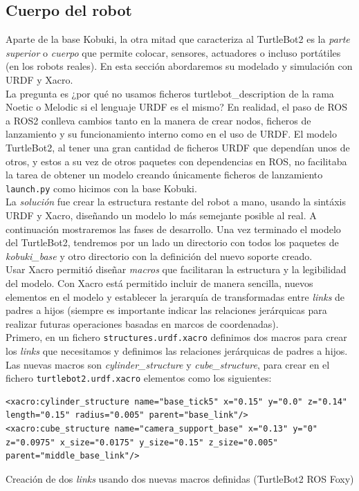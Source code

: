 \subsection{Cuerpo del robot}
\label{subsec:cuerpo_simulado}

Aparte de la base Kobuki, la otra mitad que caracteriza al TurtleBot2 es la \textit{parte superior} o \textit{cuerpo} que permite colocar, sensores, actuadores o incluso portátiles (en los robots reales). En esta sección abordaremos su modelado y simulación con URDF y Xacro.\\

La pregunta es ¿por qué no usamos ficheros turtlebot\_description de la rama Noetic o Melodic si el lenguaje URDF es el mismo? En realidad, el paso de ROS a ROS2 conlleva cambios tanto en la manera de crear nodos, ficheros de lanzamiento y su funcionamiento interno como en el uso de URDF. El modelo TurtleBot2, al tener una gran cantidad de ficheros URDF que dependían unos de otros, y estos a su vez de otros paquetes con dependencias en ROS, no facilitaba la tarea de obtener un modelo creando únicamente ficheros de lanzamiento \texttt{launch.py} como hicimos con la base Kobuki.\\

La \textit{solución} fue crear la estructura restante del robot a mano, usando la sintáxis URDF y Xacro, diseñando un modelo lo más semejante posible al real. A continuación mostraremos las fases de desarrollo. Una vez terminado el modelo del TurtleBot2, tendremos por un lado un directorio con todos los paquetes de \textit{kobuki\_base} y otro directorio con la definición del nuevo soporte creado.\\

Usar Xacro permitió diseñar \textit{macros} que facilitaran la estructura y la legibilidad del modelo. Con Xacro está permitido incluir de manera sencilla, nuevos elementos en el modelo y establecer la jerarquía de transformadas entre \textit{links} de padres a hijos (siempre es importante indicar las relaciones jerárquicas para realizar futuras operaciones basadas en marcos de coordenadas).\\


Primero, en un fichero \texttt{structures.urdf.xacro} definimos dos macros para crear los \textit{links} que necesitamos y definimos las relaciones jerárquicas de padres a hijos. Las nuevas macros son \textit{cylinder\_structure} y \textit{cube\_structure}, para crear en el fichero \texttt{turtlebot2.urdf.xacro} elementos como los siguientes:\\
\begin{code}[H]
\begin{lstlisting}
<xacro:cylinder_structure name="base_tick5" x="0.15" y="0.0" z="0.14" length="0.15" radius="0.005" parent="base_link"/>
<xacro:cube_structure name="camera_support_base" x="0.13" y="0" z="0.0975" x_size="0.0175" y_size="0.15" z_size="0.005" parent="middle_base_link"/>
\end{lstlisting}
\caption{Creación de dos \textit{links} usando dos nuevas macros definidas (TurtleBot2 ROS Foxy)}
\label{fig:creacion_link_macro}
\end{code}

